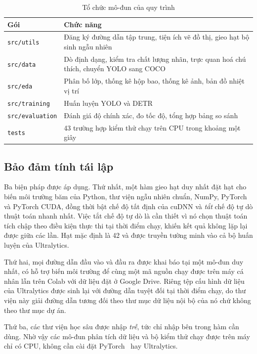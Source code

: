 \begin{table}[H]
\centering
\caption{Tổ chức mô-đun của quy trình}
\label{tab:modules}
\small
\begin{tabular}{p{4.2cm} p{9.3cm}}
\toprule
\textbf{Gói} & \textbf{Chức năng} \\
\midrule
\texttt{src/utils}      & Đăng ký đường dẫn tập trung, tiện ích vẽ đồ thị, gieo hạt bộ sinh ngẫu nhiên \\
\texttt{src/data}       & Dò định dạng, kiểm tra chất lượng nhãn, trực quan hoá chú thích, chuyển YOLO sang COCO \\
\texttt{src/eda}        & Phân bố lớp, thống kê hộp bao, thống kê ảnh, bản đồ nhiệt vị trí \\
\texttt{src/training}   & Huấn luyện YOLO và DETR \\
\texttt{src/evaluation} & Đánh giá độ chính xác, đo tốc độ, tổng hợp bảng so sánh \\
\texttt{tests}          & 43 trường hợp kiểm thử chạy trên CPU trong khoảng một giây \\
\bottomrule
\end{tabular}
\end{table}

\subsection{Bảo đảm tính tái lập}

Ba biện pháp được áp dụng. Thứ nhất, một hàm gieo hạt duy nhất đặt hạt cho biến môi trường băm
của Python, thư viện ngẫu nhiên chuẩn, NumPy, PyTorch và PyTorch CUDA, đồng thời bật chế độ tất
định của cuDNN và \emph{tắt} chế độ tự dò thuật toán nhanh nhất. Việc tắt chế độ tự dò là cần
thiết vì nó chọn thuật toán tích chập theo điều kiện thực thi tại thời điểm chạy, khiến kết quả
không lặp lại được giữa các lần. Hạt mặc định là 42 và được truyền tường minh vào cả bộ huấn luyện
của Ultralytics.

Thứ hai, mọi đường dẫn đầu vào và đầu ra được khai báo tại một mô-đun duy nhất, có hỗ trợ biến môi
trường để cùng một mã nguồn chạy được trên máy cá nhân lẫn trên Colab với dữ liệu đặt ở Google
Drive. Riêng tệp cấu hình dữ liệu của Ultralytics được sinh lại với đường dẫn tuyệt đối tại thời
điểm chạy, do thư viện này giải đường dẫn tương đối theo thư mục dữ liệu nội bộ của nó chứ không
theo thư mục dự án.

Thứ ba, các thư viện học sâu được nhập \emph{trễ}, tức chỉ nhập bên trong hàm cần dùng. Nhờ vậy
các mô-đun phân tích dữ liệu và bộ kiểm thử chạy được trên máy chỉ có CPU, không cần cài đặt
PyTorch~\cite{paszke2019pytorch} hay Ultralytics.


